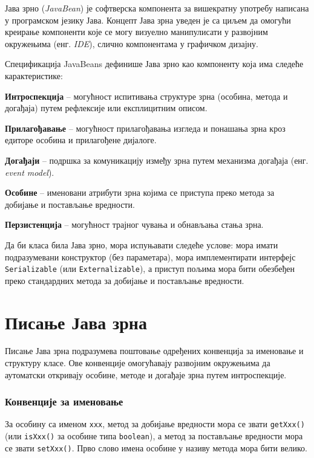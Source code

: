 Јава зрно (\textit{JavaBean}) је софтверска компонента за вишекратну употребу написана у програмском језику Јава. Концепт Јава зрна уведен је са циљем да омогући креирање компоненти које се могу визуелно манипулисати у развојним окружењима (енг. \textit{IDE}), слично компонентама у графичком дизајну.

Спецификација JavaBeans дефинише Јава зрно као компоненту која има следеће карактеристике:

\textbf{Интроспекција} – могућност испитивања структуре зрна (особина, метода и догађаја) путем рефлексије или експлицитним описом.

\textbf{Прилагођавање} – могућност прилагођавања изгледа и понашања зрна кроз едиторе особина и прилагођене дијалоге.

\textbf{Догађаји} – подршка за комуникацију између зрна путем механизма догађаја (енг. \textit{event model}).

\textbf{Особине} – именовани атрибути зрна којима се приступа преко метода за добијање и постављање вредности.

\textbf{Перзистенција} – могућност трајног чувања и обнављања стања зрна.

Да би класа била Јава зрно, мора испуњавати следеће услове: мора имати подразумевани конструктор (без параметара), мора имплементирати интерфејс \texttt{Serializable} (или \texttt{Externalizable}), а приступ пољима мора бити обезбеђен преко стандардних метода за добијање и постављање вредности.


\section{Писање Јава зрна}

Писање Јава зрна подразумева поштовање одређених конвенција за именовање и структуру класе. Ове конвенције омогућавају развојним окружењима да аутоматски откривају особине, методе и догађаје зрна путем интроспекције.


\subsubsection{Конвенције за именовање}

За особину са именом \texttt{xxx}, метод за добијање вредности мора се звати \texttt{getXxx()} (или \texttt{isXxx()} за особине типа \texttt{boolean}), а метод за постављање вредности мора се звати \texttt{setXxx()}. Прво слово имена особине у називу метода мора бити велико.


